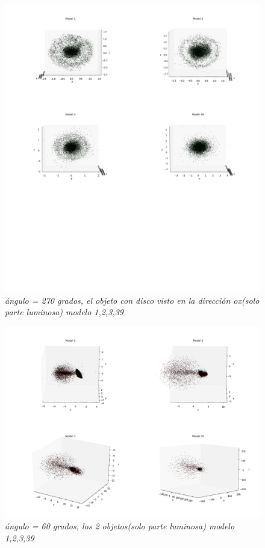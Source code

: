 \documentclass[12pt]{article} %
\renewcommand{\=}[1]{\stackrel{#1}{=}} %
\theoremstyle{definition}
\theoremstyle{remark}
\begin{document}
\begin{figure}[!ht]
 \centering
 \includegraphics[scale=0.2]{270deg-m-c2.png}
 \caption{\emph{ ángulo = 270 grados, el objeto con disco visto en la dirección ox(solo parte luminosa) modelo 1,2,3,39 }}
\end{figure}


\begin{figure}[!ht]
 \centering
 \includegraphics[scale=0.2]{60deg-m.png}
 \caption{\emph{ ángulo = 60 grados, los 2 objetos(solo parte luminosa) modelo 1,2,3,39 }}
\end{figure}
\end{document}

